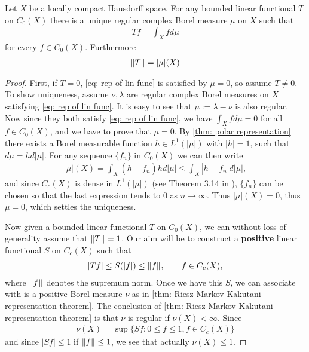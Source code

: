 \documentclass[../../main.tex]{subfiles}
\begin{document}
\begin{theorem}\label{thm: Riesz-markov}
Let $X$ be a locally compact Hausdorff space. For any bounded linear functional $T$ on $C_{0}(X)$ there is a unique regular complex Borel measure $\mu$ on $X$ such that
\begin{align}
	Tf=\int_{X}fd\mu \label{eq: rep of lin func}
\end{align}
for every $f\in C_{0}(X)$. Furthermore
\begin{align}
	\Vert{T}\Vert_{}=|\mu|(X) \label{eq: jadfhsadf}
\end{align}
\end{theorem}
\begin{proof}
First, if $T=0$, \eqref{eq: rep of lin func} is satisfied by $\mu=0$, so assume $T\neq 0$.
To show uniqueness, assume $\nu, \lambda$ are regular complex Borel measures on $X$ satisfying \eqref{eq: rep of lin func}. It is easy to see that $\mu:=\lambda-\nu$ is also regular. Now since they both satisfy \eqref{eq: rep of lin func}, we have $\int_{X}fd\mu=0$ for all $f\in C_{0}(X)$, and we have to prove that $\mu=0$. By \cref{thm: polar representation} there exists a Borel measurable function $h\in L^{1}(|\mu|)$ with $|h|=1$, such that $d\mu=hd|\mu|$. For any sequence $\{f_{n}\}$ in $C_{0}(X)$ we can then write
\begin{align*}
	|\mu|(X)=\int_{X}(\overline{h}-f_{n})hd|\mu|\le \int_{X}|\overline{h}-f_{n}|d|\mu|,
\end{align*}
and since $C_{c}(X)$ is dense in $L^{1}(|\mu|)$ (see Theorem 3.14 in \cite{Rudin87}), $\{f_{n}\}$ can be chosen so that the last expression tends to $0$ as $n\to \infty$. Thus $|\mu|(X)=0$, thus $\mu=0$, which settles the uniqueness.

Now given a bounded linear functional $T$ on $C_{0}(X)$, we can without loss of generality assume that $\Vert{T}\Vert_{}=1$. Our aim will be to construct a \textbf{positive} linear functional $S$ on $C_{c}(X)$ such that
\begin{align}
	|Tf| \le S(|f|)\le \Vert{f}\Vert_{}, \qquad f\in C_{c}(X), \label{eq: ineq of lin funcs}
\end{align}
where $\Vert{f}\Vert_{}$ denotes the supremum norm. Once we have this $S$, we can associate with is a positive Borel measure $\nu$ as in \cref{thm: Riesz-Markov-Kakutani representation theorem}. The conclusion of \cref{thm: Riesz-Markov-Kakutani representation theorem} is that $\nu$ is regular if $\nu(X)<\infty$. Since
\begin{align*}
	\nu(X)=\sup\{ Sf: 0 \le f \le 1,  f\in C_{c}(X) \}
\end{align*}
and since $|Sf| \le 1$ if $\Vert{f}\Vert_{} \le 1$, we see that actually $\nu(X)\le 1$.


\end{proof}
\end{document}
